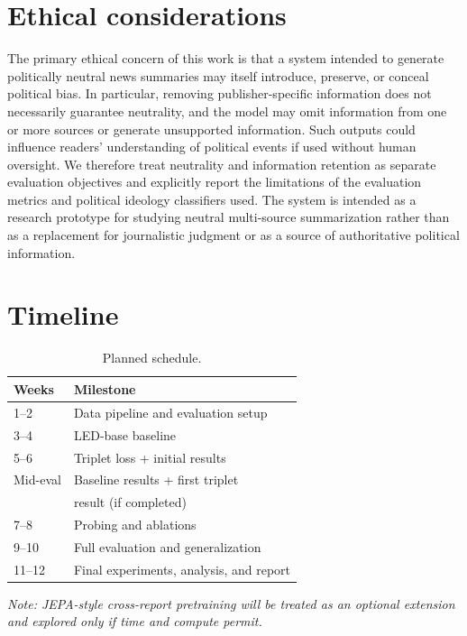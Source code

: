 \documentclass[11pt]{article}
\begin{document}
\section{Ethical considerations}

The primary ethical concern of this work is that a system intended to generate politically neutral news summaries may itself introduce, preserve, or conceal political bias. In particular, removing publisher-specific information does not necessarily guarantee neutrality, and the model may omit information from one or more sources or generate unsupported information. Such outputs could influence readers' understanding of political events if used without human oversight. We therefore treat neutrality and information retention as separate evaluation objectives and explicitly report the limitations of the evaluation metrics and political ideology classifiers used. The system is intended as a research prototype for studying neutral multi-source summarization rather than as a replacement for journalistic judgment or as a source of authoritative political information.

\section{Timeline}

\begin{table}[h]
\centering\small
\begin{tabular}{@{}ll@{}}
\toprule
\textbf{Weeks} & \textbf{Milestone} \\
\midrule
1--2   & Data pipeline and evaluation setup \\
3--4   & LED-base baseline \\
5--6   & Triplet loss + initial results \\
Mid-eval & Baseline results + first triplet \\
       & result (if completed) \\
7--8   & Probing and ablations \\
9--10  & Full evaluation and generalization \\
11--12 & Final experiments, analysis, and report \\
\bottomrule
\end{tabular}
\caption{Planned schedule.}
\label{tab:timeline}
\end{table}

{\small\textit{Note: JEPA-style cross-report pretraining will be treated as an optional extension and explored only if time and compute permit.}}


\end{document}
